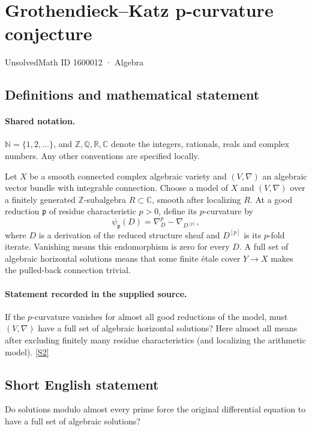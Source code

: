 \documentclass[11pt]{article}
\newcommand{\sref}[2]{\hyperlink{source:#1:#2}{[S#2]}}
\begin{document}
\setcounter{section}{1600011}
\section{Grothendieck–Katz p-curvature conjecture}\label{1600012}
{\small\sffamily UnsolvedMath ID 1600012 · Algebra}
\subsection{Definitions and mathematical statement}

\paragraph{Shared notation.}$\mathbb N=\{1,2,\ldots\}$, and $\mathbb Z,\mathbb Q,\mathbb R,\mathbb C$ denote the integers, rationals, reals and complex numbers. Any other conventions are specified locally.


Let $X$ be a smooth connected complex algebraic variety and $(V,\nabla)$ an algebraic vector bundle with integrable connection. Choose a model of $X$ and $(V,\nabla)$ over a finitely generated $\mathbb Z$-subalgebra $R\subset\mathbb C$, smooth after localizing $R$. At a good reduction $\mathfrak p$ of residue characteristic $p>0$, define its $p$-curvature by
\[\psi_{\mathfrak p}(D)=\nabla_D^p-\nabla_{D^{[p]}},
\]
where $D$ is a derivation of the reduced structure sheaf and $D^{[p]}$ is its $p$-fold iterate. Vanishing means this endomorphism is zero for every $D$. A full set of algebraic horizontal solutions means that some finite étale cover $Y\to X$ makes the pulled-back connection trivial.
\paragraph{Statement recorded in the supplied source.}
If the $p$-curvature vanishes for almost all good reductions of the model, must $(V,\nabla)$ have a full set of algebraic horizontal solutions? Here almost all means after excluding finitely many residue characteristics (and localizing the arithmetic model). \sref{1600012}{2}
\subsection{Short English statement}
Do solutions modulo almost every prime force the original differential equation to have a full set of algebraic solutions?
\end{document}
